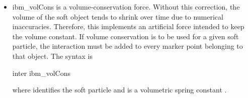 \begin{itemize}
\item ibm\_volCons is a volume-conservation force. Without this correction, the volume of the soft object tends to shrink over time due to numerical inaccuracies. Therefore, this implements an artificial force intended to keep the volume constant. If volume conservation is to be used for a given soft particle, the interaction must be added to every marker point belonging to that object. The syntax is
\begin{essyntax}
  inter  ibm_volCons  
  \begin{features}
  \end{features}
\end{essyntax}
where  identifies the soft particle and  is a volumetric spring constant \cite{KruegerThesis}.
\end{itemize}


